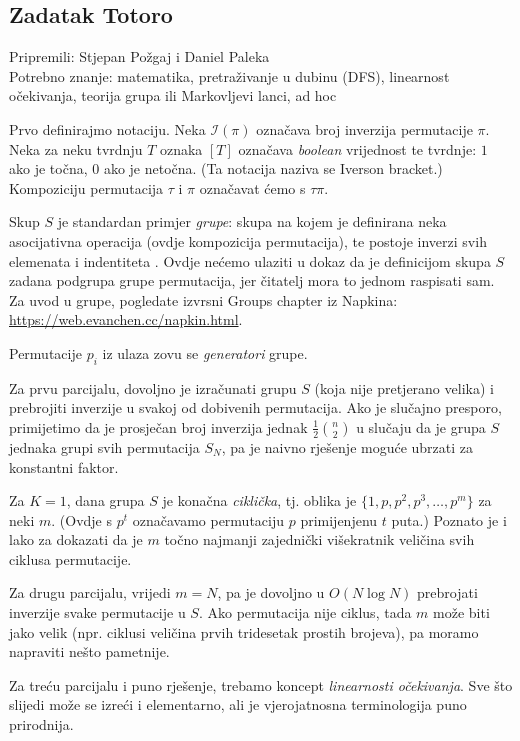 \newcommand\EE{\mathbb E}
\newcommand\PP{\mathbb P}
\newcommand\II{\mathcal I}

\subsection*{Zadatak Totoro}
\textsf{Pripremili: Stjepan Požgaj i Daniel Paleka}\\
\textsf{Potrebno znanje: matematika, pretraživanje u dubinu (DFS), 
linearnost očekivanja, teorija grupa ili Markovljevi lanci, ad hoc }

Prvo definirajmo notaciju.
Neka $\mathcal{I}(\pi)$ označava broj inverzija permutacije $\pi$.
Neka za neku tvrdnju $T$ oznaka $[T]$ označava \textit{boolean} vrijednost
te tvrdnje: $1$ ako je točna, $0$ ako je netočna. (Ta notacija naziva se 
Iverson bracket.) Kompoziciju permutacija $\tau$ i $\pi$ označavat ćemo s
$\tau \pi$.

Skup $S$ je standardan primjer \textit{grupe}: skupa na kojem je definirana
neka asocijativna operacija (ovdje kompozicija permutacija), te postoje
inverzi svih elemenata i indentiteta .
Ovdje nećemo ulaziti u dokaz da je definicijom skupa $S$ zadana podgrupa
grupe permutacija, jer čitatelj mora to jednom raspisati sam.
Za uvod u grupe, pogledate izvrsni Groups chapter iz Napkina:
\url{https://web.evanchen.cc/napkin.html}.

Permutacije $p_i$ iz ulaza zovu se \textit{generatori} grupe.

Za prvu parcijalu, dovoljno je izračunati grupu $S$ (koja nije 
pretjerano velika) i prebrojiti inverzije u svakoj
od dobivenih permutacija. Ako je slučajno presporo, 
primijetimo da je prosječan broj inverzija
jednak $\frac{1}{2} \binom{n}{2}$
u slučaju da je grupa $S$ jednaka grupi svih permutacija $S_N$,
pa je naivno rješenje moguće ubrzati za konstantni faktor.

Za $K = 1$, dana grupa $S$ je konačna \textit{ciklička}, 
tj. oblika je $\{ 1, p, p^2, p^3, \ldots, p^m \}$ za neki $m$.
(Ovdje s $p^t$ označavamo permutaciju $p$ primijenjenu $t$ puta.)
Poznato je i lako za dokazati da je $m$ točno najmanji
zajednički višekratnik veličina svih ciklusa permutacije.

Za drugu parcijalu, vrijedi $m = N$, pa je dovoljno u $O(N \log N)$
prebrojati inverzije svake permutacije u $S$. 
Ako permutacija nije ciklus, tada $m$ može biti jako velik
(npr. ciklusi veličina prvih tridesetak prostih brojeva), 
pa moramo napraviti nešto pametnije.

Za treću parcijalu i puno rješenje, trebamo koncept \textit{linearnosti
očekivanja}. Sve što slijedi može se izreći i elementarno,
ali je vjerojatnosna terminologija puno prirodnija.

